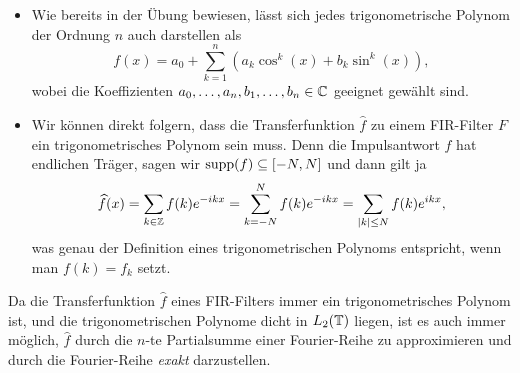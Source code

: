 \begin{remark}\leavevmode
\begin{itemize}
\item Wie bereits in der Übung bewiesen, lässt sich jedes trigonometrische Polynom der Ordnung
$ n $ auch darstellen als
\[
  f(x) = a_{0} + \sum_{k = 1}^{n} \left( a_{k}\cos^{k}(x) + b_{k}\sin^{k}(x) \right),
\]
wobei die Koeffizienten $ a_{0}, \ldots, a_{n}, b_{1}, \ldots, b_{n} \in \mathbb{C} $ geeignet gewählt sind.
\item Wir können direkt folgern, dass die Transferfunktion $ \widehat{f} $ zu einem 
FIR-Filter $ F $ ein trigonometrisches Polynom sein muss. Denn die Impulsantwort $ f $ hat 
endlichen Träger, sagen wir $ \operatorname{supp}(f) \subseteq [-N, N] $ und dann gilt ja
\[
    \widehat{f}(x)
  = \sum_{k \in \mathbb{Z}} f(k) e^{-ikx}
  = \sum_{k = -N}^{N} f(k) e^{-ikx} 
  = \sum_{|k| \leq N} f(k) e^{ikx},
\]
was genau der Definition eines trigonometrischen Polynoms entspricht, wenn man $ f(k) = f_{k} $
setzt.
\end{itemize}
\end{remark}

\begin{remark}
Da die Transferfunktion $ \widehat{f} $ eines FIR-Filters immer ein trigonometrisches Polynom ist, 
und die trigonometrischen Polynome dicht in $ L_{2}(\mathbb{T}) $ liegen, ist es auch immer möglich,
$ \widehat{f} $ durch die $ n $-te Partialsumme einer Fourier-Reihe zu approximieren und durch die 
Fourier-Reihe \emph{exakt} darzustellen.
\end{remark}

